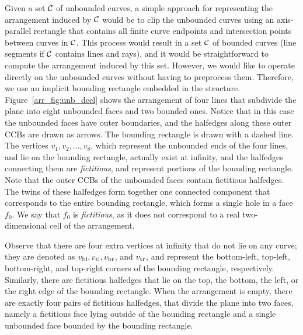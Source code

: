 \begin{ccAdvanced}
Given a set ${\cal C}$ of unbounded curves, a simple approach for
representing the arrangement induced by ${\cal C}$ would be to clip the
unbounded curves using an axis-parallel rectangle that contains all
finite curve endpoints and intersection points between curves in
${\cal C}$. This process would result in a set ${\cal C}$ of bounded curves
(line segments if ${\cal C}$ contains lines and rays), and it would be
straightforward to compute the arrangement induced by this set.
However, we would like to operate directly on the unbounded curves
without having to preprocess them. Therefore, we use an implicit
bounding rectangle embedded in the \dcel{} structure.
Figure~\ref{arr_fig:unb_dcel} shows the arrangement of four lines
that subdivide the plane into eight unbounded faces and two bounded
ones. Notice that in this case the unbounded faces have outer
boundaries, and the halfedges along these outer CCBs are drawn as 
arrows. The bounding rectangle is drawn with a dashed line. The
vertices $v_1,v_2,\ldots,v_8$, which represent the unbounded ends of 
the four lines, and lie on the bounding rectangle, actually exist at
infinity, and the halfedges connecting them are \emph{fictitious}, and
represent portions of the bounding rectangle. Note that the outer CCBs
of the unbounded faces contain fictitious halfedges. The twins of these
halfedges form together one connected component that corresponds to
the entire bounding rectangle, which forms a single hole in a face
$f_0$. We say that $f_0$ is \emph{fictitious}, as it does
not correspond to a real two-dimensional cell of the arrangement.

Observe that there are four extra vertices at infinity that do not lie
on any curve; they are denoted as $v_{\rm bl}, v_{\rm tl}, 
v_{\rm br}$, and $v_{\rm tr}$, and represent the bottom-left, top-left,
bottom-right, and top-right corners of the bounding rectangle,
respectively. Similarly, there are fictitious halfedges that lie on
the top, the bottom, the left, or the right edge of the bounding
rectangle. When the arrangement is empty, there are exactly
four pairs of fictitious halfedges, that divide the plane into two
faces, namely a fictitious face lying outside of the bounding
rectangle and a single unbounded face bounded by the bounding rectangle. 


\end{ccAdvanced}
